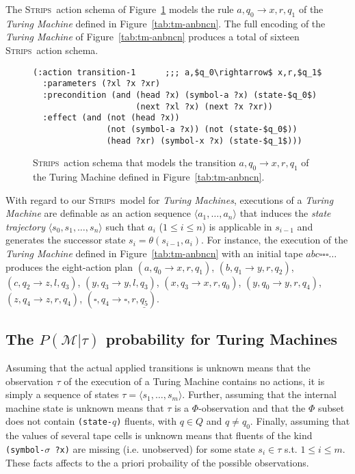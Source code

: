 \documentclass[letterpaper]{article} %
\newcommand{\tup}[1]{{\langle #1 \rangle}}
\newcommand{\strips}{\textsc{Strips}}     %
\begin{document}
The \strips\ action schema of Figure~\ref{fig:update-rule} models the rule $a,q_0\rightarrow x,r,q_1$ of the {\em Turing Machine} defined in Figure~\ref{tab:tm-anbncn}. The full encoding of the {\em Turing Machine} of Figure~\ref{tab:tm-anbncn} produces a total of sixteen \strips\ action schema. 
\begin{figure}
\begin{scriptsize}
\begin{lstlisting}
(:action transition-1      ;;; a,$q_0\rightarrow$ x,r,$q_1$
  :parameters (?xl ?x ?xr)
  :precondition (and (head ?x) (symbol-a ?x) (state-$q_0$)
                     (next ?xl ?x) (next ?x ?xr))
  :effect (and (not (head ?x)) 
               (not (symbol-a ?x)) (not (state-$q_0$))
               (head ?xr) (symbol-x ?x) (state-$q_1$)))
\end{lstlisting}
\end{scriptsize}
 \caption{\small \strips\ action schema that models the transition $a,q_0\rightarrow x,r,q_1$ of the Turing Machine defined in Figure~\ref{tab:tm-anbncn}.}
\label{fig:update-rule}
\end{figure}

With regard to our \strips\ model for {\em Turing Machines}, executions of a {\em Turing Machine} are definable as an action sequence $\tup{a_1, \ldots, a_n}$ that induces the {\em state trajectory} $\tup{s_0, s_1, \ldots, s_n}$ such that $a_i$ ({\small $1\leq i\leq n$}) is applicable in $s_{i-1}$ and generates the successor state $s_i=\theta(s_{i-1},a_i)$. For instance, the execution of the {\em Turing Machine} defined in Figure~\ref{tab:tm-anbncn} with an initial tape $abc\square\square\square\ldots$ produces the eight-action plan {\small $(a,q_0\rightarrow x,r,q_1)$, $(b,q_1\rightarrow y,r,q_2)$, $(c,q_2\rightarrow z,l,q_3)$, $(y,q_3\rightarrow y,l,q_3)$, $(x,q_3\rightarrow x,r,q_0)$, $(y,q_0\rightarrow y,r,q_4)$, $(z,q_4\rightarrow z,r,q_4)$, $(\square,q_4\rightarrow \square,r,\underline{q_5})$}.


\subsection{The $P(\mathcal{M}|\tau)$ probability for Turing Machines}
Assuming that the actual applied transitions is unknown means that the observation $\tau$ of the execution of a Turing Machine contains no actions, it is simply a sequence of states $\tau=\tup{s_1, \ldots , s_m}$. Further, assuming that the internal machine state is unknown means that $\tau$ is a $\Phi$-observation and that the $\Phi$ subset does not contain {\small\tt (state-$q$)} fluents, with $q\in Q$ and $q\neq q_0$. Finally, assuming that the values of several tape cells is unknown means that fluents of the kind {\small\tt (symbol-$\sigma$ ?x)} are missing (i.e. unobserved) for some state $s_i\in \tau$ s.t. $1\leq i\leq m$. These facts affects to the a priori probaility of the possible observations.
\end{document}
